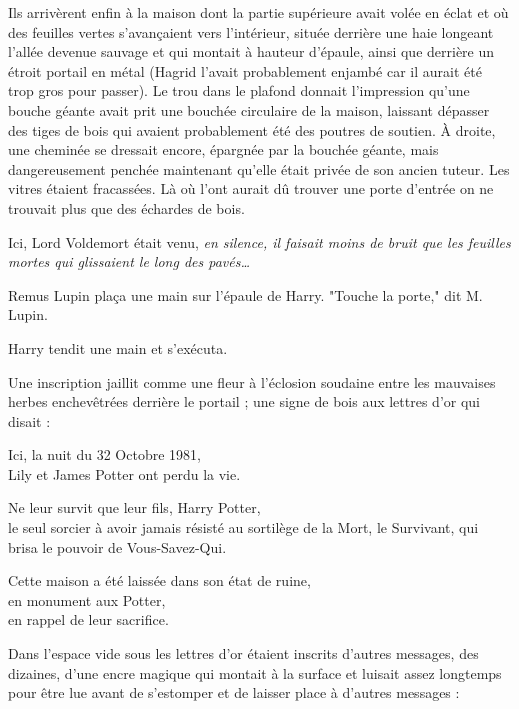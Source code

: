 Ils arrivèrent enfin à la maison dont la partie supérieure avait volée en éclat et où des feuilles vertes s'avançaient vers l'intérieur, située derrière une haie longeant l'allée devenue sauvage et qui montait à hauteur d'épaule, ainsi que derrière un étroit portail en métal (Hagrid l'avait probablement enjambé car il aurait été trop gros pour passer). Le trou dans le plafond donnait l'impression qu'une bouche géante avait prit une bouchée circulaire de la maison, laissant dépasser des tiges de bois qui avaient probablement été des poutres de soutien. À droite, une cheminée se dressait encore, épargnée par la bouchée géante, mais dangereusement penchée maintenant qu'elle était privée de son ancien tuteur. Les vitres étaient fracassées. Là où l'ont aurait dû trouver une porte d'entrée on ne trouvait plus que des échardes de bois.

Ici, Lord Voldemort était venu, \emph{en silence, il faisait moins de bruit que les feuilles mortes qui glissaient le long des pavés…} 

Remus Lupin plaça une main sur l'épaule de Harry. "Touche la porte," dit M. Lupin.

Harry tendit une main et s'exécuta.

Une inscription jaillit comme une fleur à l'éclosion soudaine entre les mauvaises herbes enchevêtrées derrière le portail ; une signe de bois aux lettres d'or qui disait :


\begin{center}Ici, la nuit du 32 Octobre 1981,\\Lily et James Potter ont perdu la vie.\end{center}



\begin{center}Ne leur survit que leur fils, Harry Potter,\\le seul sorcier à avoir jamais résisté au sortilège de la Mort, le Survivant, qui brisa le pouvoir de Vous-Savez-Qui.\end{center}



\begin{center}Cette maison a été laissée dans son état de ruine,\\en monument aux Potter,\\en rappel de leur sacrifice.\end{center}


Dans l'espace vide sous les lettres d'or étaient inscrits d'autres messages, des dizaines, d'une encre magique qui montait à la surface et luisait assez longtemps pour être lue avant de s'estomper et de laisser place à d'autres messages :


